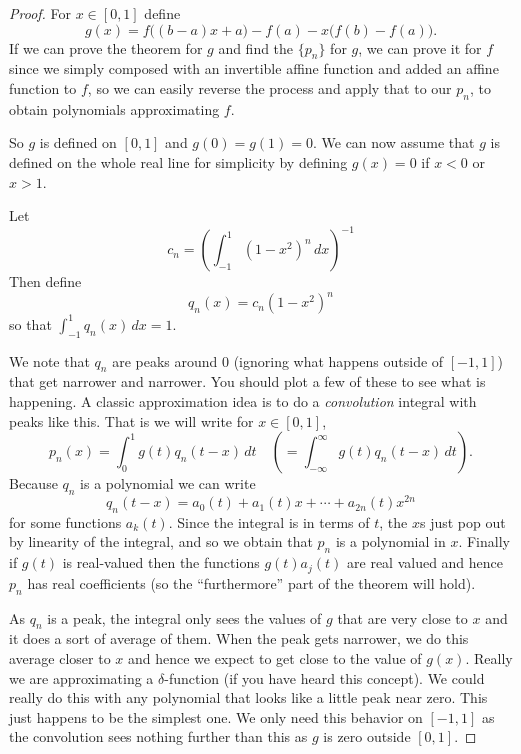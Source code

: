 \documentclass[12pt]{book}
\theoremstyle{plain}
\theoremstyle{remark}
\theoremstyle{definition}
\theoremstyle{exercise}
\theoremstyle{example}
\begin{document}
\begin{proof}
For $x \in [0,1]$ define
$$
g(x) = f\bigl((b-a)x+a\bigr)-f(a) - x\bigl(f(b)-f(a)\bigr) .
$$
If we can prove the theorem for $g$ and find the $\{ p_n \}$ for $g$,
we can prove it for $f$ since we simply
composed with an invertible affine function and added an affine
function to $f$, so we can easily reverse the process and apply that to our
$p_n$, to obtain polynomials approximating $f$.

So $g$ is defined on $[0,1]$ and $g(0)=g(1)=0$.  We can now assume that
$g$ is defined on the whole real line for simplicity by defining
$g(x) = 0$ if $x < 0$ or $x > 1$.

Let
$$
c_n = {\left( \int_{-1}^1 {(1-x^2)}^n\,dx \right)}^{-1}
$$
Then define
$$
q_n(x) = c_n (1-x^2)^n
$$
so that $\int_{-1}^1 q_n(x)\,dx = 1$.

We note that $q_n$ are peaks around 0 (ignoring what happens outside
of $[-1,1]$) that get narrower and narrower.  You should plot a few of these
to see what is happening.  A classic approximation idea
is to do a \emph{convolution} integral with peaks like this.  That is we will
write for $x \in [0,1]$,
$$
p_n(x) = \int_{0}^1 g(t)q_n(t-x) \,dt \quad \left( = \int_{-\infty}^\infty
g(t)q_n(t-x) \,dt \right) .
$$
Because $q_n$ is a polynomial we can write
$$
q_n(t-x) = a_0(t) + a_1(t)x + \cdots + a_{2n}(t) x^{2n}
$$
for some functions $a_k(t)$.
Since the integral is in terms of $t$, the $x$s just pop out
by linearity of the integral,
and so we obtain that $p_n$ is a polynomial in $x$.
Finally if $g(t)$ is real-valued then the functions $g(t)a_j(t)$ are real
valued and hence $p_n$ has real coefficients (so the ``furthermore'' part of the
theorem will hold).

As $q_n$ is a peak, the integral
only sees the values of $g$ that are
very close to $x$ and it does a sort of average of them.
When the peak gets narrower, we do this average closer to $x$
and hence we expect to get close to the value of $g(x)$.  Really we are
approximating a $\delta$-function (if you have heard this concept).
We could really do this with any polynomial that looks like a little peak
near zero.  This just happens to be the simplest one.
We only need this behavior on $[-1,1]$ as the convolution sees nothing
further than this as $g$ is zero outside $[0,1]$.


\end{proof}
\end{document}
